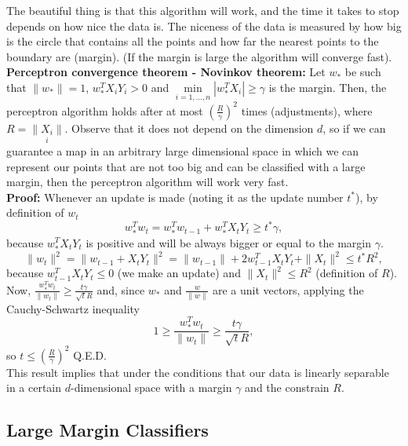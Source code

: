 \documentclass[11pt, english]{article}
\begin{document}
The beautiful thing is that this algorithm will work, and the time it takes to stop depends on how nice the data is. The niceness of the data is measured by how big is the circle that contains all the points and how far the nearest points to the boundary are (margin). (If the margin is large the algorithm will converge fast).\\

\textbf{Perceptron convergence theorem - Novinkov theorem: }Let $w_*$ be such that $\|w_*\|=1$, $w_*^TX_iY_i>0$ and $\underset{i=1,\dots,n}{\min}|w_*^TX_i|\geq\gamma$ is the margin. Then, the perceptron algorithm holds after at most $\left(\frac{R}{\gamma}\right)^2$ times (adjustments), where $R=\underset{i}{\|X_i\|}$. Observe that it does not depend on the dimension $d$, so if we can guarantee a map in an arbitrary large dimensional space in which we can represent our points that are not too big and can be classified with a large margin, then the perceptron algorithm will work very fast.\\

\textbf{Proof:} Whenever an update is made (noting it as the update number $t^*$), by definition of $w_t$
\begin{equation}
	w_*^Tw_t= w_*^Tw_{t-1} + w_*^TX_tY_t\geq t^*\gamma,	
\end{equation}
because $w_*^TX_tY_t$ is positive and will be always bigger or equal to the margin $\gamma$.
\begin{equation}
	\|w_t\|^2=\|w_{t-1}+X_tY_t\|^2=\|w_{t-1}\|+2w_{t-1}^TX_tY_t+\|X_t\|^2\leq t^*R^2,
\end{equation} 
because $w_{t-1}^TX_tY_t\leq 0$ (we make an update) and $\|X_t\|^2\leq R^2$ (definition of $R$). Now, $\frac{w_*^Tw_t}{\|w_t\|}\geq \frac{t \gamma}{\sqrt{t}R}$ and, since $w_*$ and $\frac{w}{\|w\|}$ are a unit vectors, applying the Cauchy-Schwartz inequality 
\begin{equation}
	1\geq \frac{w_*^Tw_t}{\|w_t\|}\geq \frac{t \gamma}{\sqrt{t}R},
\end{equation} 
so $t\leq\left(\frac{R}{\gamma}\right)^2$ Q.E.D.\\

This result implies that under the conditions that our data is linearly separable in a certain $d$-dimensional space with a margin $\gamma$ and the constrain $R$.

\subsection{Large Margin Classifiers}
 
\end{document}

